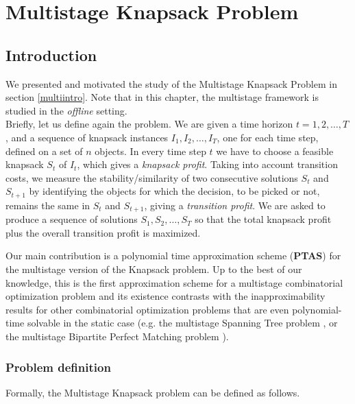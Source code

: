 \documentclass[a4paper]{book}
\begin{document}
\chapter{Multistage Knapsack Problem}\label{chap:multiknap}

\section{Introduction}
We presented and motivated the study of the Multistage Knapsack Problem in section \ref{multiintro}. Note that in this chapter, the multistage framework is studied in the \textit{offline} setting.\\

Briefly, let us define again the problem. We are 
given a time horizon $t=1,2,\ldots,T$, and a sequence of knapsack instances $I_1,I_2,\ldots,I_T$, one for each time step, defined on a set of $n$ objects. In every time step $t$ we have to choose a feasible knapsack $S_t$ of $I_t$, which gives a \emph{knapsack profit}. Taking into account transition costs, we measure the stability/similarity of two  consecutive solutions  $S_t$ and $S_{t+1}$ by identifying the objects for which the decision, to be picked or not, remains the same in $S_t$ and $S_{t+1}$, giving a \emph{transition profit}. We are asked to produce a sequence of solutions $S_1,S_2,\ldots,S_T$  so that the total knapsack profit plus the overall transition profit is maximized.

Our main contribution is a polynomial time approximation scheme (\textbf{PTAS}) for the multistage  version of the {\sc Knapsack} problem. Up to the best of our knowledge, this is the first approximation scheme for a multistage combinatorial optimization problem and its existence contrasts with the inapproximability results for other combinatorial optimization problems that are even polynomial-time solvable in the static case (e.g. the {\sc multistage  Spanning Tree} problem \cite{Gupta}, or the {\sc multistage  Bipartite Perfect Matching} problem \cite{Bampis}).

\subsection{Problem definition}
Formally, the {\sc Multistage  Knapsack} problem can be defined as follows.
\end{document}
